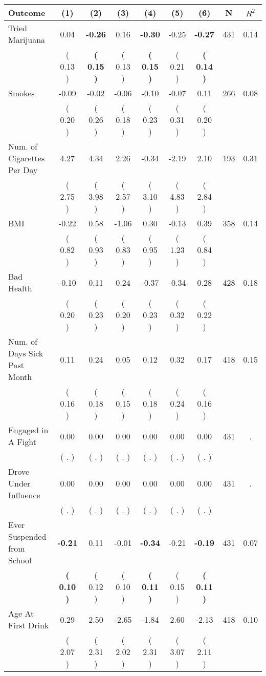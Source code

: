 \begin{tabular}{lcccccccc}
\toprule
 \textbf{Outcome} & \textbf{(1)} & \textbf{(2)} & \textbf{(3)} & \textbf{(4)} & \textbf{(5)} & \textbf{(6)} & \textbf{N} & \textbf{$ R^2$} \\
\midrule
Tried Marijuana &      0.04 & \textbf{    -0.26} &      0.16 & \textbf{    -0.30} &     -0.25 & \textbf{    -0.27} & 431 &       0.14 \\ 
 & (     0.13 ) & \textbf{(     0.15 )} & (     0.13 ) & \textbf{(     0.15 )} & (     0.21 ) & \textbf{(     0.14 )} & \\
Smokes &     -0.09 &     -0.02 &     -0.06 &     -0.10 &     -0.07 &      0.11 & 266 &       0.08 \\ 
 & (     0.20 ) & (     0.26 ) & (     0.18 ) & (     0.23 ) & (     0.31 ) & (     0.20 ) & \\
Num. of Cigarettes Per Day &      4.27 &      4.34 &      2.26 &     -0.34 &     -2.19 &      2.10 & 193 &       0.31 \\ 
 & (     2.75 ) & (     3.98 ) & (     2.57 ) & (     3.10 ) & (     4.83 ) & (     2.84 ) & \\
BMI &     -0.22 &      0.58 &     -1.06 &      0.30 &     -0.13 &      0.39 & 358 &       0.14 \\ 
 & (     0.82 ) & (     0.93 ) & (     0.83 ) & (     0.95 ) & (     1.23 ) & (     0.84 ) & \\
Bad Health &     -0.10 &      0.11 &      0.24 &     -0.37 &     -0.34 &      0.28 & 428 &       0.18 \\ 
 & (     0.20 ) & (     0.23 ) & (     0.20 ) & (     0.23 ) & (     0.32 ) & (     0.22 ) & \\
Num. of Days Sick Past Month &      0.11 &      0.24 &      0.05 &      0.12 &      0.32 &      0.17 & 418 &       0.15 \\ 
 & (     0.16 ) & (     0.18 ) & (     0.15 ) & (     0.18 ) & (     0.24 ) & (     0.16 ) & \\
Engaged in A Fight &      0.00 &      0.00 &      0.00 &      0.00 &      0.00 &      0.00 & 431 &          . \\ 
 & (        . ) & (        . ) & (        . ) & (        . ) & (        . ) & (        . ) & \\
Drove Under Influence &      0.00 &      0.00 &      0.00 &      0.00 &      0.00 &      0.00 & 431 &          . \\ 
 & (        . ) & (        . ) & (        . ) & (        . ) & (        . ) & (        . ) & \\
Ever Suspended from School & \textbf{    -0.21} &      0.11 &     -0.01 & \textbf{    -0.34} &     -0.21 & \textbf{    -0.19} & 431 &       0.07 \\ 
 & \textbf{(     0.10 )} & (     0.12 ) & (     0.10 ) & \textbf{(     0.11 )} & (     0.15 ) & \textbf{(     0.11 )} & \\
Age At First Drink &      0.29 &      2.50 &     -2.65 &     -1.84 &      2.60 &     -2.13 & 418 &       0.10 \\ 
 & (     2.07 ) & (     2.31 ) & (     2.02 ) & (     2.31 ) & (     3.07 ) & (     2.11 ) & \\
\bottomrule
\end{tabular}
